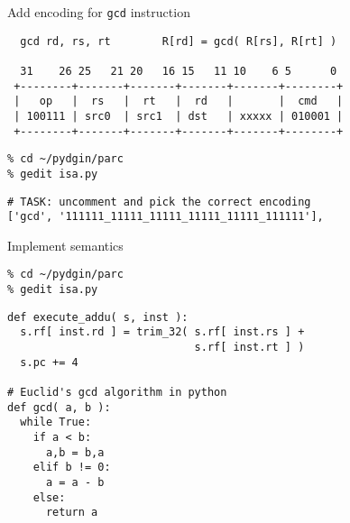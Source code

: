 
\begin{task}
\begin{frame}[fragile]{Add encoding for \texttt{gcd} instruction}

\begin{verbatim}
  gcd rd, rs, rt        R[rd] = gcd( R[rs], R[rt] )

  31    26 25   21 20   16 15   11 10    6 5      0
 +--------+-------+-------+-------+-------+--------+
 |   op   |  rs   |  rt   |  rd   |       |  cmd   |
 | 100111 | src0  | src1  | dst   | xxxxx | 010001 |
 +--------+-------+-------+-------+-------+--------+
\end{verbatim}

\vspace{-10pt}

\begin{verbatim}
% cd ~/pydgin/parc
% gedit isa.py
\end{verbatim}

\vspace{-10pt}

\begin{lstlisting}
# TASK: uncomment and pick the correct encoding
['gcd', '111111_11111_11111_11111_11111_111111'],
\end{lstlisting}
\end{frame}
\end{task}


\begin{task}
\begin{frame}[fragile]{Implement semantics}

\vspace{-20pt}

\begin{verbatim}
% cd ~/pydgin/parc
% gedit isa.py
\end{verbatim}

\vspace{-20pt}

\begin{lstlisting}
def execute_addu( s, inst ):
  s.rf[ inst.rd ] = trim_32( s.rf[ inst.rs ] +
                             s.rf[ inst.rt ] )
  s.pc += 4

# Euclid's gcd algorithm in python
def gcd( a, b ):
  while True:
    if a < b:
      a,b = b,a
    elif b != 0:
      a = a - b
    else:
      return a
\end{lstlisting}

\end{frame}
\end{task}

